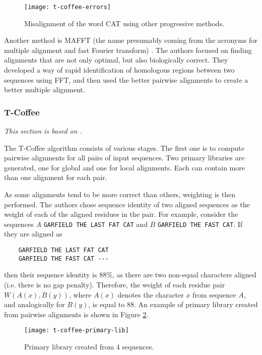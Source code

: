 \begin{figure}[h]
\centering
\texttt{[image: t-coffee-errors]}
\caption{Misalignment of the word CAT using other progressive methods. \citep[Figure~2(a)]{t_coffee}}
\label{fig:msa_mistakes}
\end{figure}

Another method is MAFFT (the name presumably coming from the acronyms for multiple alignment and fast Fourier transform) \citep{mafft}.
The authors focused on finding alignments that are not only optimal, but also biologically correct. They developed a way of rapid identification
of homologous regions between two sequences using FFT, and then used the better pairwise alignments to create a better multiple alignment.

\subsubsection{T-Coffee}

\emph{This section is based on \cite{t_coffee}.}

The T-Coffee algorithm consists of various stages. The first one is to compute pairwise alignments for all pairs of input sequences.
Two primary libraries are generated, one for global and one for local alignments. Each can contain more than one alignment for each pair.

As some alignments tend to be more correct than others, weighting is then performed. The authors chose sequence identity of two aligned
sequences as the weight of each of the aligned residues in the pair. For example, consider the sequences $A$ \verb|GARFIELD THE LAST FAT CAT|
and $B$ \verb|GARFIELD THE FAST CAT|. If they are aligned as

\begin{verbatim}
    GARFIELD THE LAST FAT CAT
    GARFIELD THE FAST CAT ---
\end{verbatim}

then their sequence identity is 88\%, as there are two non-equal characters aligned (i.e. there is no gap penalty). Therefore, the weight of
each residue pair $W(A(x), B(y))$, where $A(x)$ denotes the character $x$ from sequence $A$, and analogically for $B(y)$, is equal to 88.
An example of primary library created from pairwise alignments is shown in Figure \ref{fig:primary_lib}.

\begin{figure}[h]
\centering
\texttt{[image: t-coffee-primary-lib]}
\caption{Primary library created from 4 sequences. \citep[Figure~2(b)]{t_coffee}}
\label{fig:primary_lib}
\end{figure}

